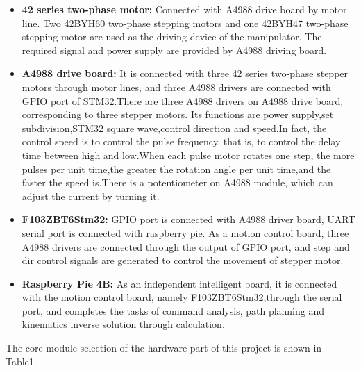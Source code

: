 \documentclass{hci}
\begin{document}
\begin{itemize}
	\item \textbf{42 series two-phase motor:} Connected with A4988 drive board by motor line. Two 42BYH60 two-phase stepping motors and one 42BYH47 two-phase stepping motor are used as the driving device of the manipulator. The required signal and power supply are provided by A4988 driving board.
	\item \textbf{A4988 drive board:} It is connected with three 42 series two-phase stepper motors through motor lines, and three A4988 drivers are connected with GPIO port of STM32.There are three A4988 drivers on A4988 drive board, corresponding to three stepper motors. Its functions are power supply,set subdivision,STM32 square wave,control direction and speed.In fact, the control speed is to control the pulse frequency, that is, to control the delay time between high and low.When each pulse motor rotates one step, the more pulses per unit time,the greater the rotation angle per unit time,and the faster the speed is.There is a potentiometer on A4988 module, which can adjust the current by turning it.
	\item \textbf{F103ZBT6Stm32:} GPIO port is connected with A4988 driver board, UART serial port is connected with raspberry pie. As a motion control board, three A4988 drivers are connected through the output of GPIO port, and step and dir control signals are generated to control the movement of stepper motor.
	\item \textbf{Raspberry Pie 4B:} As an independent intelligent board, it is connected with the motion control board, namely F103ZBT6Stm32,through the serial port, and completes the tasks of command analysis, path planning and kinematics inverse solution through calculation.
\end{itemize}
The core module selection of the hardware part of this project is shown in Table1.
\end{document}

